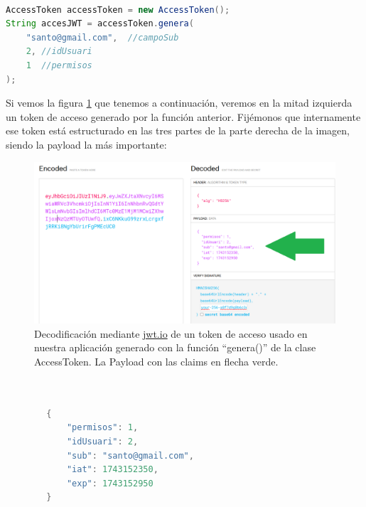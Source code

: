\documentclass[a4paper,12pt]{report}
\begin{document}
		
		
\begin{lstlisting}[language=Java, basicstyle=\ttfamily\footnotesize, keywordstyle=\color{magenta}]

AccessToken accessToken = new AccessToken();
String accesJWT = accessToken.genera(
	"santo@gmail.com",  //campoSub
	2, //idUsuari
	1  //permisos
);


\end{lstlisting}
		
		Si vemos la figura \ref{fig:jwtioMostraPayload} que tenemos a continuación, veremos en la mitad izquierda un token de acceso generado por la función anterior. Fijémonos que internamente ese token está estructurado en las tres partes de la parte derecha de la imagen, siendo la payload la más importante:
		
	
			\setlength{\belowcaptionskip}{3pt}
			\FloatBarrier
			\begin{figure}[H]
				\centering
				\caption{Decodificación mediante \href{https://www.jwt.io}{jwt.io} de un token de acceso usado en nuestra aplicación generado con la función ``genera()'' de la clase AccessToken. La Payload con las claims en flecha verde.}
				\includegraphics[width=1\textwidth]{img/jwtio_mostra_payload.png}

				\label{fig:jwtioMostraPayload} 
			\end{figure}
			\FloatBarrier

		
\begin{lstlisting}[language=Java, basicstyle=\ttfamily\footnotesize, keywordstyle=\color{magenta}]
			
		
		{
		    "permisos": 1,
		    "idUsuari": 2,
		    "sub": "santo@gmail.com",
		    "iat": 1743152350,
		    "exp": 1743152950
		}
			
\end{lstlisting}
		
\end{document}
